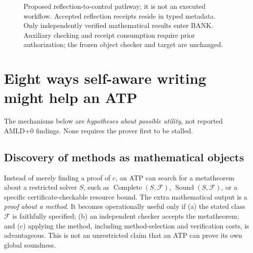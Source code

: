 \documentclass[11pt,letterpaper]{article}
\begin{document}
\begin{figure}[htbp]
\centering
{}
\caption{Proposed reflection-to-control pathway; it is not an executed workflow. Accepted reflection receipts reside in typed metadata. Only independently verified mathematical results enter BANK. Auxiliary checking and receipt consumption require prior authorization; the frozen object checker and target are unchanged.}
\end{figure}

\section{Eight ways self-aware writing might help an ATP}
The mechanisms below are \emph{hypotheses about possible utility}, not reported AMLD+0 findings. None requires the prover first to be stalled.

\subsection{Discovery of methods as mathematical objects}
Instead of merely finding a proof of $c$, an ATP can search for a metatheorem about a restricted solver $S$, such as $\operatorname{Complete}(S,\mathcal F)$, $\operatorname{Sound}(S,\mathcal F)$, or a specific certificate-checkable resource bound. The extra mathematical output is a \emph{proof about a method}. It becomes operationally useful only if (a) the stated class $\mathcal F$ is faithfully specified; (b) an independent checker accepts the metatheorem; and (c) applying the method, including method-selection and verification costs, is advantageous. This is not an unrestricted claim that an ATP can prove its own global soundness.
\end{document}
